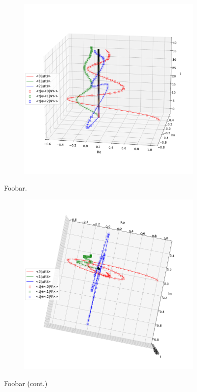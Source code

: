 

\begin{figure}[]
  \centering
  \begin{subfigure}{\textwidth}
      \includegraphics[width=\textwidth]{img/3ldetect/PWSpaceTimeFit_side.pdf}
  \end{subfigure}
  \caption{Foobar.}
\end{figure}
\begin{figure}\ContinuedFloat
  \centering
  \begin{subfigure}{\textwidth}
      \includegraphics[width=\textwidth]{img/3ldetect/PWSpaceTimeFit_top.pdf}
  \end{subfigure}
  \caption{Foobar (cont.)}
\end{figure}

